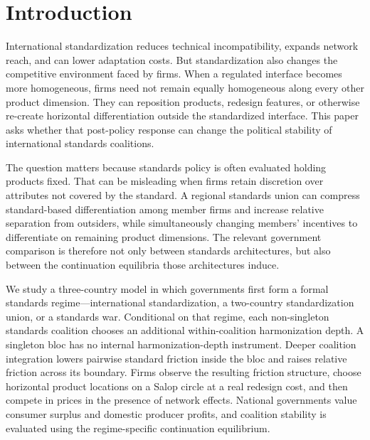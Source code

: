 \section{Introduction}\label{sec:introduction}

International standardization reduces technical incompatibility, expands network reach, and can lower adaptation costs. But standardization also changes the competitive environment faced by firms. When a regulated interface becomes more homogeneous, firms need not remain equally homogeneous along every other product dimension. They can reposition products, redesign features, or otherwise re-create horizontal differentiation outside the standardized interface. This paper asks whether that post-policy response can change the political stability of international standards coalitions.

The question matters because standards policy is often evaluated holding products fixed. That can be misleading when firms retain discretion over attributes not covered by the standard. A regional standards union can compress standard-based differentiation among member firms and increase relative separation from outsiders, while simultaneously changing members' incentives to differentiate on remaining product dimensions. The relevant government comparison is therefore not only between standards architectures, but also between the continuation equilibria those architectures induce.

We study a three-country model in which governments first form a formal standards regime---international standardization, a two-country standardization union, or a standards war. Conditional on that regime, each non-singleton standards coalition chooses an additional within-coalition harmonization depth. A singleton bloc has no internal harmonization-depth instrument. Deeper coalition integration lowers pairwise standard friction inside the bloc and raises relative friction across its boundary. Firms observe the resulting friction structure, choose horizontal product locations on a Salop circle at a real redesign cost, and then compete in prices in the presence of network effects. National governments value consumer surplus and domestic producer profits, and coalition stability is evaluated using the regime-specific continuation equilibrium.

